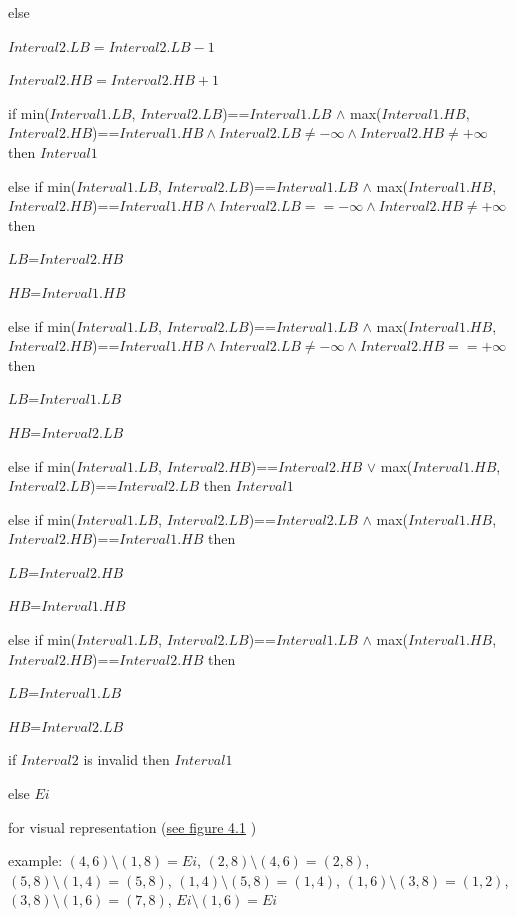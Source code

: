 else

$Interval2.LB=Interval2.LB-1$

$Interval2.HB=Interval2.HB+1$

if min($Interval1.LB$, $Interval2.LB$)==$Interval1.LB$ $\land$ max($Interval1.HB$, $Interval2.HB$)==$Interval1.HB \land Interval2.LB \neq -\infty \land Interval2.HB \neq +\infty$ then $Interval1$

else if min($Interval1.LB$, $Interval2.LB$)==$Interval1.LB$ $\land$ max($Interval1.HB$, $Interval2.HB$)==$Interval1.HB \land Interval2.LB == -\infty \land Interval2.HB \neq +\infty$ then 

$LB$=$Interval2.HB$

$HB$=$Interval1.HB$

else if min($Interval1.LB$, $Interval2.LB$)==$Interval1.LB$ $\land$ max($Interval1.HB$, $Interval2.HB$)==$Interval1.HB \land Interval2.LB \neq -\infty \land Interval2.HB == +\infty$ then 

$LB$=$Interval1.LB$

$HB$=$Interval2.LB$

else if min($Interval1.LB$, $Interval2.HB$)==$Interval2.HB$ $\lor$ max($Interval1.HB$, $Interval2.LB$)==$Interval2.LB$ then $Interval1$

else if min($Interval1.LB$, $Interval2.LB$)==$Interval2.LB$ $\land$ max($Interval1.HB$, $Interval2.HB$)==$Interval1.HB$ then

$LB$=$Interval2.HB$

$HB$=$Interval1.HB$

else if min($Interval1.LB$, $Interval2.LB$)==$Interval1.LB$ $\land$ max($Interval1.HB$, $Interval2.HB$)==$Interval2.HB$ then

$LB$=$Interval1.LB$

$HB$=$Interval2.LB$

if $Interval2$ is invalid then $Interval1$

else $Ei$

for visual representation (\hyperref[fig:aminusb]{see figure 4.1} )

example: $(4,6)\setminus(1,8)=Ei$, $(2,8)\setminus(4,6)=(2,8)$, $(5,8)\setminus(1,4)=(5,8)$, $(1,4)\setminus(5,8)=(1,4)$, $(1,6)\setminus(3,8)=(1,2)$, $(3,8)\setminus(1,6)=(7,8)$, $Ei\setminus(1,6)=Ei$

